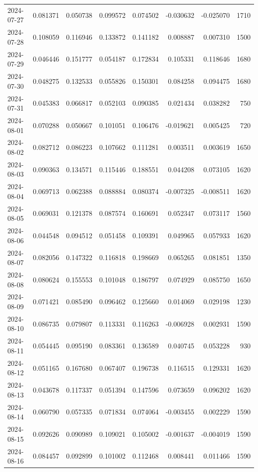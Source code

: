 \begin{tabular}{lrrrrrrr}
2024-07-27 & 0.081371 & 0.050738 & 0.099572 & 0.074502 & -0.030632 & -0.025070 & 1710 \\
2024-07-28 & 0.108059 & 0.116946 & 0.133872 & 0.141182 & 0.008887 & 0.007310 & 1500 \\
2024-07-29 & 0.046446 & 0.151777 & 0.054187 & 0.172834 & 0.105331 & 0.118646 & 1680 \\
2024-07-30 & 0.048275 & 0.132533 & 0.055826 & 0.150301 & 0.084258 & 0.094475 & 1680 \\
2024-07-31 & 0.045383 & 0.066817 & 0.052103 & 0.090385 & 0.021434 & 0.038282 & 750 \\
2024-08-01 & 0.070288 & 0.050667 & 0.101051 & 0.106476 & -0.019621 & 0.005425 & 720 \\
2024-08-02 & 0.082712 & 0.086223 & 0.107662 & 0.111281 & 0.003511 & 0.003619 & 1650 \\
2024-08-03 & 0.090363 & 0.134571 & 0.115446 & 0.188551 & 0.044208 & 0.073105 & 1620 \\
2024-08-04 & 0.069713 & 0.062388 & 0.088884 & 0.080374 & -0.007325 & -0.008511 & 1620 \\
2024-08-05 & 0.069031 & 0.121378 & 0.087574 & 0.160691 & 0.052347 & 0.073117 & 1560 \\
2024-08-06 & 0.044548 & 0.094512 & 0.051458 & 0.109391 & 0.049965 & 0.057933 & 1620 \\
2024-08-07 & 0.082056 & 0.147322 & 0.116818 & 0.198669 & 0.065265 & 0.081851 & 1350 \\
2024-08-08 & 0.080624 & 0.155553 & 0.101048 & 0.186797 & 0.074929 & 0.085750 & 1650 \\
2024-08-09 & 0.071421 & 0.085490 & 0.096462 & 0.125660 & 0.014069 & 0.029198 & 1230 \\
2024-08-10 & 0.086735 & 0.079807 & 0.113331 & 0.116263 & -0.006928 & 0.002931 & 1590 \\
2024-08-11 & 0.054445 & 0.095190 & 0.083361 & 0.136589 & 0.040745 & 0.053228 & 930 \\
2024-08-12 & 0.051165 & 0.167680 & 0.067407 & 0.196738 & 0.116515 & 0.129331 & 1620 \\
2024-08-13 & 0.043678 & 0.117337 & 0.051394 & 0.147596 & 0.073659 & 0.096202 & 1620 \\
2024-08-14 & 0.060790 & 0.057335 & 0.071834 & 0.074064 & -0.003455 & 0.002229 & 1590 \\
2024-08-15 & 0.092626 & 0.090989 & 0.109021 & 0.105002 & -0.001637 & -0.004019 & 1590 \\
2024-08-16 & 0.084457 & 0.092899 & 0.101002 & 0.112468 & 0.008441 & 0.011466 & 1590 \\

\end{tabular}
